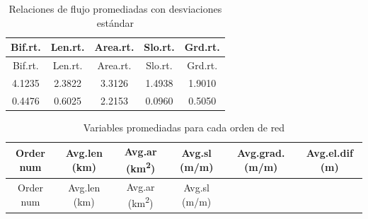 \documentclass[11pt,]{article}
\begin{document}
\begin{longtable}[]{@{}ccccc@{}}
\caption{\label{tab:estandard} Relaciones de flujo promediadas con
desviaciones estándar}\tabularnewline
\toprule
Bif.rt. & Len.rt. & Area.rt. & Slo.rt. & Grd.rt.\tabularnewline
\midrule
\endfirsthead
\toprule
Bif.rt. & Len.rt. & Area.rt. & Slo.rt. & Grd.rt.\tabularnewline
\midrule
\endhead
4.1235 & 2.3822 & 3.3126 & 1.4938 & 1.9010\tabularnewline
0.4476 & 0.6025 & 2.2153 & 0.0960 & 0.5050\tabularnewline
\bottomrule
\end{longtable}

\begin{longtable}[]{@{}cccccc@{}}
\caption{\label{tab:promo} Variables promediadas para cada orden de
red}\tabularnewline
\toprule
\begin{minipage}[b]{0.08\columnwidth}\centering\strut
Order num\strut
\end{minipage} & \begin{minipage}[b]{0.11\columnwidth}\centering\strut
Avg.len (km)\strut
\end{minipage} & \begin{minipage}[b]{0.25\columnwidth}\centering\strut
Avg.ar (km\textsuperscript{2})\strut
\end{minipage} & \begin{minipage}[b]{0.11\columnwidth}\centering\strut
Avg.sl (m/m)\strut
\end{minipage} & \begin{minipage}[b]{0.14\columnwidth}\centering\strut
Avg.grad. (m/m)\strut
\end{minipage} & \begin{minipage}[b]{0.13\columnwidth}\centering\strut
Avg.el.dif (m)\strut
\end{minipage}\tabularnewline
\midrule
\endfirsthead
\toprule
\begin{minipage}[b]{0.08\columnwidth}\centering\strut
Order num\strut
\end{minipage} & \begin{minipage}[b]{0.11\columnwidth}\centering\strut
Avg.len (km)\strut
\end{minipage} & \begin{minipage}[b]{0.25\columnwidth}\centering\strut
Avg.ar (km\textsuperscript{2})\strut
\end{minipage} & \begin{minipage}[b]{0.11\columnwidth}\centering\strut
Avg.sl (m/m)\strut
\end{minipage} & \begin{minipage}[b]{0.14\columnwidth}\centering\strut

\end{minipage}
\end{longtable}
\end{document}
